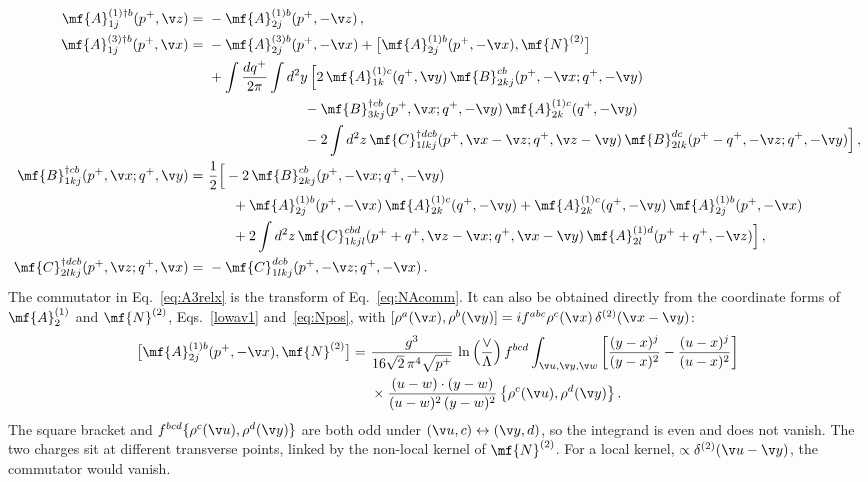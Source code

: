 \begin{align}
\mf{A}^{(1)\dagger b}_{1j}(p^{+},\v z)=\ &-\mf{A}^{(1)b}_{2j}(p^{+},-\v z)\,,\label{eq:A1relx}\\
\mf{A}^{(3)\dagger b}_{1j}(p^{+},\v x)=\ &-\mf{A}^{(3)b}_{2j}(p^{+},-\v x)+\big[\mf{A}^{(1)b}_{2j}(p^{+},-\v x),\mf{N}^{(2)}\big]\notag\\
&+\int\frac{dq^{+}}{2\pi}\int d^{2}y\,\Big[2\,\mf{A}^{(1)c}_{1k}(q^{+},\v y)\,\mf{B}^{cb}_{2kj}(p^{+},-\v x;q^{+},-\v y)\notag\\
&\hspace{2.4cm}-\mf{B}^{\dagger cb}_{3kj}(p^{+},\v x;q^{+},-\v y)\,\mf{A}^{(1)c}_{2k}(q^{+},-\v y)\notag\\
&\hspace{2.4cm}-2\int d^{2}z\,\mf{C}^{\dagger dcb}_{1lkj}(p^{+},\v x-\v z;q^{+},\v z-\v y)\,\mf{B}^{dc}_{2lk}(p^{+}-q^{+},-\v z;q^{+},-\v y)\Big]\,,\label{eq:A3relx}\\
\mf{B}^{\dagger cb}_{1kj}(p^{+},\v x;q^{+},\v y)=\ &\frac{1}{2}\Big[-2\,\mf{B}^{cb}_{2kj}(p^{+},-\v x;q^{+},-\v y)\notag\\
&\hspace{0.6cm}+\mf{A}^{(1)b}_{2j}(p^{+},-\v x)\,\mf{A}^{(1)c}_{2k}(q^{+},-\v y)+\mf{A}^{(1)c}_{2k}(q^{+},-\v y)\,\mf{A}^{(1)b}_{2j}(p^{+},-\v x)\notag\\
&\hspace{0.6cm}+2\int d^{2}z\,\mf{C}^{cbd}_{1kjl}(p^{+}+q^{+},\v z-\v x;q^{+},\v x-\v y)\,\mf{A}^{(1)d}_{2l}(p^{+}+q^{+},-\v z)\Big]\,,\label{eq:B1relx}\\
\mf{C}^{\dagger dcb}_{2lkj}(p^{+},\v z;q^{+},\v x)=\ &-\mf{C}^{dcb}_{1lkj}(p^{+},-\v z;q^{+},-\v x)\,.\label{eq:C2relx}
\end{align}
The commutator in Eq.~\eqref{eq:A3relx} is the transform of Eq.~\eqref{eq:NAcomm}. It can also be obtained
directly from the coordinate forms of $\mf{A}^{(1)}_{2}$ and $\mf{N}^{(2)}$, Eqs.~\eqref{lowav1}
and~\eqref{eq:Npos}, with
$[\rho^{a}(\v x),\rho^{b}(\v y)]=if^{abc}\rho^{c}(\v x)\,\delta^{(2)}(\v x-\v y)$:
\begin{align}\label{eq:NAcommx}
\big[\mf{A}^{(1)b}_{2j}(p^{+},-\v x),\mf{N}^{(2)}\big]=\ &\frac{g^{3}}{16\sqrt{2}\,\pi^{4}\sqrt{p^{+}}}\,
\ln\Big(\frac{\vee}{\Lambda}\Big)\,f^{bcd}\int_{\v u,\v y,\v w}
\bigg[\frac{(y-x)^{j}}{(y-x)^{2}}-\frac{(u-x)^{j}}{(u-x)^{2}}\bigg]\notag\\
&\times\frac{(u-w)\cdot(y-w)}{(u-w)^{2}\,(y-w)^{2}}\,\big\{\rho^{c}(\v u),\rho^{d}(\v y)\big\}\,.
\end{align}
The square bracket and $f^{bcd}\{\rho^{c}(\v u),\rho^{d}(\v y)\}$ are both odd under
$(\v u,c)\leftrightarrow(\v y,d)$, so the integrand is even and does not vanish. The two charges sit at
different transverse points, linked by the non-local kernel of $\mf{N}^{(2)}$. For a local kernel,
$\propto\delta^{(2)}(\v u-\v y)$, the commutator would vanish.


